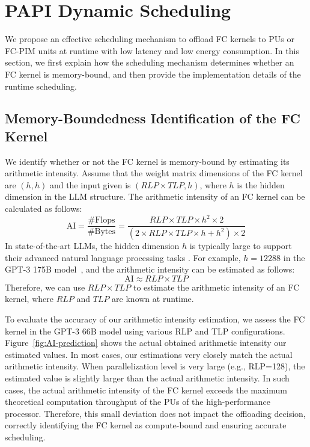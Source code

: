 \section{PAPI Dynamic Scheduling}

We propose an effective scheduling mechanism to offload FC kernels to PUs or FC-PIM units at runtime with low latency and low energy consumption. In this section, we first explain how the scheduling mechanism determines whether an FC kernel is memory-bound, and then provide the implementation details of the runtime scheduling.



\subsection{Memory-Boundedness Identification of the FC Kernel}


We identify whether or not the FC kernel is memory-bound by estimating its arithmetic intensity. Assume that the weight matrix dimensions of the FC kernel are $(h, h)$ and the input given is $(RLP \times TLP, h)$, where $h$ is the hidden dimension in the LLM structure. The arithmetic intensity of an FC kernel can be calculated as follows:
\begin{equation}
\text{AI} = \frac{\#\text{Flops}}{\#\text{Bytes}} = \frac{RLP \times TLP \times h^2 \times 2}{(2 \times RLP \times TLP \times h + h^2) \times 2}
\end{equation}
In state-of-the-art LLMs, the hidden dimension $h$ is typically large to support their advanced natural language processing tasks \cite{chowdhery2023palm}.
For example, $h = 12288$ in the GPT-3 175B model~\cite{brown2020language}, and the arithmetic intensity can be estimated as follows:
\begin{equation}
\text{AI} \approx RLP \times TLP
\end{equation}
Therefore, we can use $RLP \times TLP$ to estimate the arithmetic intensity of an FC kernel, where $RLP$ and $TLP$ are known at runtime.

To evaluate the accuracy of our arithmetic intensity estimation, we assess the FC kernel in the GPT-3 66B model using various RLP and TLP configurations. Figure~\ref{fig:AI-prediction} shows the actual obtained arithmetic intensity our estimated values. In most cases, our estimations very closely match the actual arithmetic intensity.
When parallelization level is very large (e.g., RLP=128), the estimated value is slightly larger than the actual arithmetic intensity. In such cases, the actual arithmetic intensity of the FC kernel exceeds the maximum theoretical computation throughput of the PUs of the high-performance processor. Therefore, this small deviation does not impact the offloading decision, correctly identifying the FC kernel as compute-bound and ensuring accurate scheduling.

